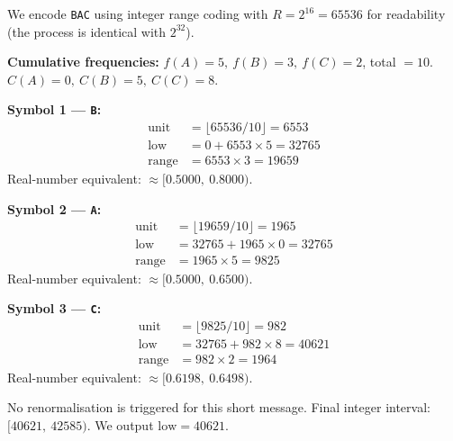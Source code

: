 \begin{examplebox}
We encode \texttt{BAC} using integer range coding with $R = 2^{16} = 65536$
for readability (the process is identical with $2^{32}$).

\medskip
\textbf{Cumulative frequencies:}
$f(A)=5,\ f(B)=3,\ f(C)=2$, total $=10$.
$C(A)=0,\ C(B)=5,\ C(C)=8$.

\medskip
\textbf{Symbol 1 — \texttt{B}:}
\begin{align*}
  \mathrm{unit} &= \lfloor 65536 / 10 \rfloor = 6553 \\
  \mathrm{low}  &= 0 + 6553 \times 5 = 32765 \\
  \mathrm{range}&= 6553 \times 3 = 19659
\end{align*}
Real-number equivalent: $\approx [0.5000,\ 0.8000)$.

\medskip
\textbf{Symbol 2 — \texttt{A}:}
\begin{align*}
  \mathrm{unit} &= \lfloor 19659 / 10 \rfloor = 1965 \\
  \mathrm{low}  &= 32765 + 1965 \times 0 = 32765 \\
  \mathrm{range}&= 1965 \times 5 = 9825
\end{align*}
Real-number equivalent: $\approx [0.5000,\ 0.6500)$.

\medskip
\textbf{Symbol 3 — \texttt{C}:}
\begin{align*}
  \mathrm{unit} &= \lfloor 9825 / 10 \rfloor = 982 \\
  \mathrm{low}  &= 32765 + 982 \times 8 = 40621 \\
  \mathrm{range}&= 982 \times 2 = 1964
\end{align*}
Real-number equivalent: $\approx [0.6198,\ 0.6498)$.

\medskip
No renormalisation is triggered for this short message. Final integer interval:
$[40621,\ 42585)$. We output $\mathrm{low} = 40621$.
\end{examplebox}

